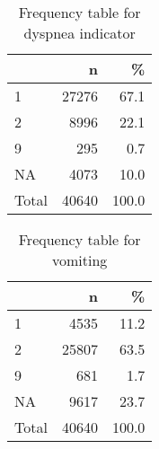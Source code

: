 \documentclass[
]{article}
\newenvironment{Shaded}{\begin{snugshade}}{\end{snugshade}}
\newcommand{\DataTypeTok}[1]{\textcolor[rgb]{0.13,0.29,0.53}{#1}}
\newcommand{\DecValTok}[1]{\textcolor[rgb]{0.00,0.00,0.81}{#1}}
\newcommand{\KeywordTok}[1]{\textcolor[rgb]{0.13,0.29,0.53}{\textbf{#1}}}
\newcommand{\NormalTok}[1]{#1}
\newcommand{\OperatorTok}[1]{\textcolor[rgb]{0.81,0.36,0.00}{\textbf{#1}}}
\newcommand{\OtherTok}[1]{\textcolor[rgb]{0.56,0.35,0.01}{#1}}
\newcommand{\StringTok}[1]{\textcolor[rgb]{0.31,0.60,0.02}{#1}}
\begin{document}
\begin{table}[!h]

\caption{\label{tab:unnamed-chunk-52}Frequency table for dyspnea indicator}
\centering
\begin{tabular}[t]{l|r|r}
\hline
  & n & \%\\
\hline
1 & 27276 & 67.1\\
\hline
2 & 8996 & 22.1\\
\hline
9 & 295 & 0.7\\
\hline
NA & 4073 & 10.0\\
\hline
Total & 40640 & 100.0\\
\hline
\end{tabular}
\end{table}

\begin{Shaded}
\end{Shaded}

\begin{table}[!h]

\caption{\label{tab:unnamed-chunk-53}Frequency table for vomiting}
\centering
\begin{tabular}[t]{l|r|r}
\hline
  & n & \%\\
\hline
1 & 4535 & 11.2\\
\hline
2 & 25807 & 63.5\\
\hline
9 & 681 & 1.7\\
\hline
NA & 9617 & 23.7\\
\hline
Total & 40640 & 100.0\\
\hline
\end{tabular}
\end{table}
\end{document}
